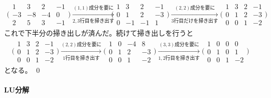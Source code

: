 \begin{align*}
\Biggl(
\begin{array}{rrrr}
1 & 3 & 2 & -1 \\
-3 & -8 & -4 & 0 \\
2 & 5 & 3 & -1
\end{array}
\Biggr)
\xrightarrow[\text{$2, 3$行目を掃き出す}]{\text{$(1, 1)$成分を要に}}
& \Biggl(
\begin{array}{rrrr}
1 & 3 & 2 & -1 \\
0 & 1 & 2 & -3 \\
0 & -1 & -1 & 1
\end{array}
\Biggr)
\xrightarrow[\text{$3$行目だけを掃き出す}]{\text{$(2, 2)$成分を要に}}
\Biggl(
\begin{array}{rrrr}
1 & 3 & 2 & -1 \\
0 & 1 & 2 & -3 \\
0 & 0 & 1 & -2
\end{array}
\Biggr)
\end{align*}
これで下半分の掃き出しが済んだ。続けて掃き出しを行うと
\begin{align*}
\Biggl(
\begin{array}{rrrr}
1 & 3 & 2 & -1 \\
0 & 1 & 2 & -3 \\
0 & 0 & 1 & -2
\end{array}
\Biggr)
\xrightarrow[\text{$1$行目を掃き出す}]{\text{$(2, 2)$成分を要に}}
\Biggl(
\begin{array}{rrrr}
1 & 0 & -4 & 8 \\
0 & 1 & 2 & -3 \\
0 & 0 & 1 & -2
\end{array}
\Biggr)
\xrightarrow[\text{$1, 2$行目を掃き出す}]{\text{$(3, 3)$成分を要に}}
\Biggl(
\begin{array}{rrrr}
1 & 0 & 0 & 0 \\
0 & 1 & 0 & 1 \\
0 & 0 & 1 & -2
\end{array}
\Biggr)
\end{align*}
となる。 \qed

\paragraph{LU分解} %

